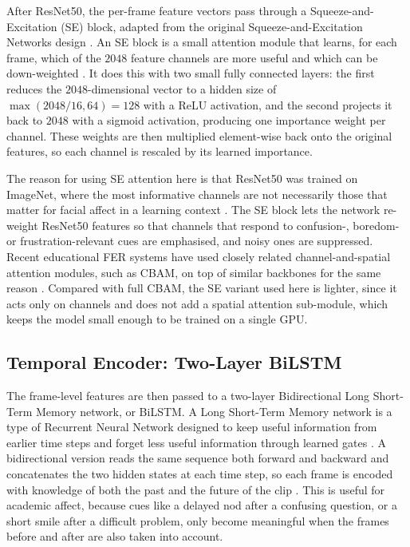 After ResNet50, the per-frame feature vectors pass through a Squeeze-and-Excitation (SE) block, adapted from the original Squeeze-and-Excitation Networks design \cite{hu_squeeze_2018}. An SE block is a small attention module that learns, for each frame, which of the $2048$ feature channels are more useful and which can be down-weighted \cite{hu_squeeze_2018}. It does this with two small fully connected layers: the first reduces the $2048$-dimensional vector to a hidden size of $\max(2048 / 16, 64) = 128$ with a ReLU activation, and the second projects it back to $2048$ with a sigmoid activation, producing one importance weight per channel. These weights are then multiplied element-wise back onto the original features, so each channel is rescaled by its learned importance.

The reason for using SE attention here is that ResNet50 was trained on ImageNet, where the most informative channels are not necessarily those that matter for facial affect in a learning context \cite{he_resnet_2016}. The SE block lets the network re-weight ResNet50 features so that channels that respond to confusion-, boredom- or frustration-relevant cues are emphasised, and noisy ones are suppressed. Recent educational FER systems have used closely related channel-and-spatial attention modules, such as CBAM, on top of similar backbones for the same reason \cite{aly_revolutionizing_2025,liu_dynamic_nodate}. Compared with full CBAM, the SE variant used here is lighter, since it acts only on channels and does not add a spatial attention sub-module, which keeps the model small enough to be trained on a single GPU.

\subsection{Temporal Encoder: Two-Layer BiLSTM}\label{sec:method_bilstm}

The frame-level features are then passed to a two-layer Bidirectional Long Short-Term Memory network, or BiLSTM. A Long Short-Term Memory network is a type of Recurrent Neural Network designed to keep useful information from earlier time steps and forget less useful information through learned gates \cite{hochreiter_lstm_1997}. A bidirectional version reads the same sequence both forward and backward and concatenates the two hidden states at each time step, so each frame is encoded with knowledge of both the past and the future of the clip \cite{hochreiter_lstm_1997,asaju_adaptive_2022,tulsani_realtime_2025}. This is useful for academic affect, because cues like a delayed nod after a confusing question, or a short smile after a difficult problem, only become meaningful when the frames before and after are also taken into account.

